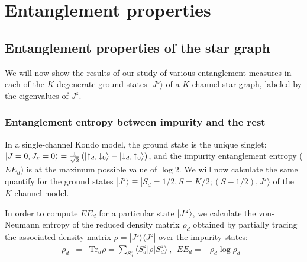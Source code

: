 \documentclass[reprint,prb,superscriptaddress]{revtex4-2}
\begin{document}
\section{Entanglement properties}
\label{sec:ent_prop}

\subsection{Entanglement properties of the star graph}
\label{sec:EE_star graph}

\noindent We will now show the results of our study of various entanglement measures in each of the $K$ degenerate ground states $|J^z\rangle$ of a $K$ channel star graph, labeled by the eigenvalues of $J^z$.
\subsubsection{Entanglement entropy between impurity and the rest}
\noindent In a single-channel Kondo model, the ground state is the unique singlet: $|J=0,J_z=0 \rangle = \frac{1}{\sqrt{2}} \left(\ket{\uparrow_{d},\downarrow_0} - \ket{\downarrow_d, \uparrow_0}\right)$, and the impurity entanglement entropy ($EE_d$) is at the  maximum possible value of $\log 2$.
We will now calculate the same quantify for the ground states $|J^z\rangle \equiv |S_d=1/2,S=K/2;(S-1/2),J^z\rangle$ of the $K$ channel model.

In order to compute \(EE_d\) for a particular state \(\ket{J^z}\), we calculate the von-Neumann entropy of the reduced density matrix \(\rho_d\) obtained by partially tracing the associated density matrix $\rho=|J^z\rangle\langle J^z|$ over the impurity states: 
\begin{eqnarray}
\rho_{d}&=& \textrm{Tr}_{d} \rho=\sum_{S_d^z} \langle S_d^z| \rho | S^z_d\rangle ~,~~EE_d = -\rho_{d} \log \rho_{d}~~~
\end{eqnarray}
\end{document}

